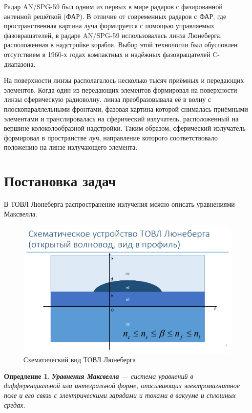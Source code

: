 \documentclass{article}
\newtheorem{definition}{Опредление}
\begin{document}
Радар AN/SPG-59 был одним из первых в мире радаров с фазированной антенной решёткой (ФАР). В отличие от современных радаров с ФАР, где пространственная картина луча формируется с помощью управляемых фазовращателей, в радаре AN/SPG-59 использовалась линза Люнеберга, расположенная в надстройке корабля. Выбор этой технологии был обусловлен отсутствием в 1960-х годах компактных и надёжных фазовращателей C-диапазона.

На поверхности линзы располагалось несколько тысяч приёмных и передающих элементов. Когда один из передающих элементов формировал на поверхности линзы сферическую радиоволну, линза преобразовывала её в волну с плоскопараллельными фронтами, фазовая картина которой снималась приёмными элементами и транслировалась на сферический излучатель, расположенный на вершине колоколообразной надстройки. Таким образом, сферический излучатель формировал в пространстве луч, направление которого соответствовало положению на линзе излучающего элемента.

\newpage

\section{Постановка задач}
В ТОВЛ Люнеберга распространение излучения можно описать уравнениями Максвелла.

\begin{figure}[H]
    \centering
    \includegraphics[width=\linewidth]{image2.png}
    \caption{Схематический вид ТОВЛ Люнеберга}
    \label{luneberg}
\end{figure}

\begin{definition}
{\bf Уравнения Максвелла} — система уравнений в дифференциальной или интегральной форме, описывающих электромагнитное поле и его связь с электрическими зарядами и токами в вакууме и сплошных средах.
\end{definition}
\end{document}

